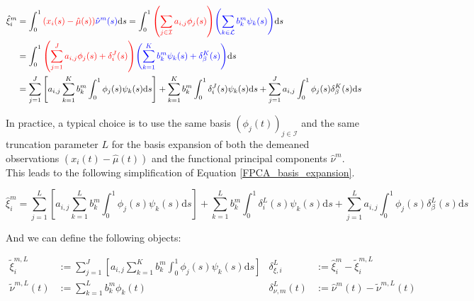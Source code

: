 \documentclass[11pt,twoside,a4paper]{article}
\begin{document}
	\begin{equation}\label{FPCA_basis_expansion}
		\begin{split}
			\hat{\xi}_{i}^m & = \int_{0}^{1} {\color{red}\left( x_i(s) - \hat{\mu}(s)\right)} {\color{blue}\hat{\nu}^m(s)} \mathrm{d}s
			= \int_{0}^{1} {\color{red}\left(\sum_{j \in \mathcal{I}} a_{i,j} \phi_j(s)\right)} {\color{blue}\left(\sum_{k \in \mathcal{L}} b_{k}^m \psi_{k}(s)\right)} \mathrm{d}s \\
			& = \int_{0}^{1} {\color{red}\left(\sum_{j = 1}^{J} a_{i,j} \phi_j(s) + \delta_i^J(s)\right)} {\color{blue}\left(\sum_{k = 1}^{K} b_{k}^m \psi_{k}(s) + \delta_{\beta}^K(s)\right)} \mathrm{d}s \\
			& = \sum_{j = 1}^{J} \left[a_{i,j}\sum_{k = 1}^{K} b_{k}^m \int_{0}^{1} \phi_j(s) \psi_{k}(s)\mathrm{d}s \right] +  \sum_{k = 1}^{K} b_{k}^m \int_{0}^{1} \delta_i^J(s) \psi_{k}(s) \mathrm{d}s + \sum_{j = 1}^{J} a_{i,j} \int_{0}^{1}\phi_j(s) \delta_{\beta}^K(s) \mathrm{d}s
		\end{split}
	\end{equation}
	
	In practice, a typical choice is to use the same basis $\left(\phi_j(t)\right)_{j \in \mathcal{I}}$ and the same truncation parameter $L$ for the basis expansion of both the demeaned observations $\left(x_i(t) - \hat{\mu}(t)\right)$ and the functional principal components $\hat{\nu}^m$. This leads to the following simplification of Equation \ref{FPCA_basis_expansion}.
	
	\begin{equation}\label{score_approx}
			\hat{\xi}_{i}^m = \sum_{j = 1}^{L} \left[a_{i,j}\sum_{k = 1}^{L} b_{k}^m \int_{0}^{1} \phi_j(s) \psi_{k}(s)\mathrm{d}s \right] +  \sum_{k = 1}^{L} b_{k}^m \int_{0}^{1} \delta_i^L(s) \psi_{k}(s) \mathrm{d}s + \sum_{j = 1}^{L} a_{i,j} \int_{0}^{1}\phi_j(s) \delta_{\beta}^L(s) \mathrm{d}s
	\end{equation}

	And we can define the following objects:

		\begin{align}
			\tilde{\xi}^{m,L}_{i} & := \sum_{j = 1}^{J} \left[a_{i,j}\sum_{k = 1}^{K} b_{k}^m \int_{0}^{1} \phi_j(s) \psi_{k}(s)\mathrm{d}s \right] 
			& \delta_{\xi, i}^L & := \hat{\xi}_{i}^m - \tilde{\xi}^{m,L}_{i} \\
			\tilde{\nu}^{m,L}(t) & := \sum_{k = 1}^{L} b_{k}^m \phi_{k}(t) 
			& \delta_{\nu, m}^L(t) & := \hat{\nu}^m(t) - \tilde{\nu}^{m,L}(t)
		\end{align}	
	
\end{document}
